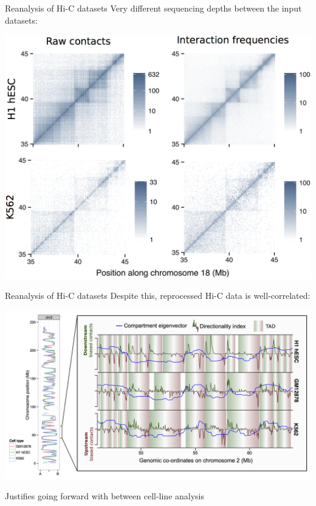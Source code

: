 \documentclass{beamer}
\begin{document}
\begin{frame}{Reanalysis of Hi-C datasets}
Very different sequencing depths between the input datasets: \\

\vspace{2em}

\centering
\includegraphics[width=.9\textwidth]{../figs/hicnorm.png}

\end{frame}

\begin{frame}{Reanalysis of Hi-C datasets}
Despite this, reprocessed Hi-C data is well-correlated: \\

\vspace{2em}

{\centering
\includegraphics[width=.9\textwidth]{../figs/blowout.png}
}
\vspace{2em}

Justifies going forward with between cell-line analysis

\end{frame}
\end{document}
